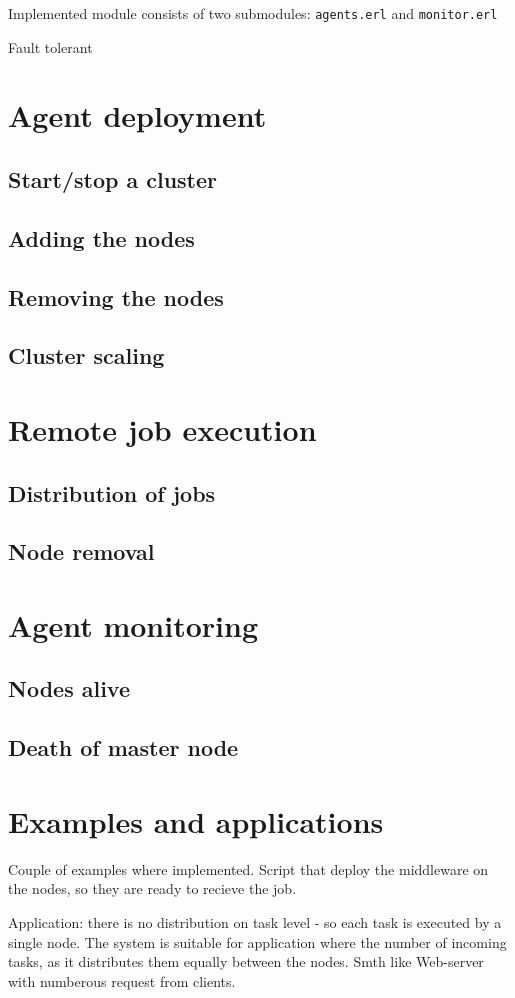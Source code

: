 \documentclass[12pt]{article}
\begin{document}
Implemented module consists of two submodules: \texttt{agents.erl} and \texttt{monitor.erl}

Fault tolerant

\section{Agent deployment}
\subsection{Start/stop a cluster}
\subsection{Adding the nodes}
\subsection{Removing the nodes}
\subsection{Cluster scaling}
\section{Remote job execution}
\subsection{Distribution of jobs}
\subsection{Node removal}
\section{Agent monitoring}
\subsection{Nodes alive}
\subsection{Death of master node}
\section{Examples and applications}

Couple of examples where implemented. Script that deploy the middleware on the nodes, so they are ready to recieve the job.

Application: there is no distribution on task level - so each task is executed by a single node. The system is suitable for application where the number of incoming tasks, as it distributes them equally between the nodes. Smth like Web-server with numberous request from clients.
\end{document}
